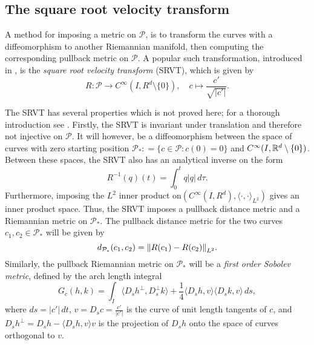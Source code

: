 \subsection{The square root velocity transform}
A method for imposing a metric on \(\mathcal{P}\), is to transform the curves with a diffeomorphism to another Riemannian manifold, then computing the corresponding pullback metric on \(\mathcal{P}\). A popular such transformation, introduced in \cite{srivastava2011_srvt}, is the \emph{square root velocity transform} (SRVT), which is given by
\begin{equation}\label{eq:SRVT}
  R :\mathcal{P} \rightarrow C^{\infty}(I, R^d \setminus \{0\}), \quad c \mapsto \frac{c'}{\sqrt{\vert c' \vert}}.
\end{equation}

The SRVT has several properties which is not proved here; for a thorough introduction see \cite{bruveris1016_srvtexample,bauer2014_rprop}. Firstly, the SRVT is invariant under translation and therefore not injective on \(\mathcal{P}\). It will however, be a diffeomorphism between the space of curves with zero starting position \(\mathcal{P}_* : = \{c \in \mathcal{P}: c(0) = 0\} \) and \(C^{\infty}(I, \mathbb{R}^d \setminus \{0\})\). Between these spaces, the SRVT also has an analytical inverse on the form
\begin{equation*}
  R^{-1}(q)(t) = \int_0 ^t q \vert q\vert \,d\tau.
\end{equation*}
Furthermore, imposing the \(L^2\) inner product on\((C^{\infty}(I, R^d), \langle \cdot , \cdot \rangle_{L^2} )\) gives an inner product space. Thus, the SRVT imposes a pullback distance metric and a Riemannian metric on \(\mathcal{P}_*\). The pullback distance metric for the two curves \(c_1, c_2 \in \mathcal{P}_*\) will be given by
\begin{equation}\label{eq:sob_pullback_dist}
  d_{\mathcal{P}_*}(c_1, c_2) = \norm{R(c_1) - R(c_2)}_{L^2}.
\end{equation}
Similarly, the pullback Riemannian metric on \(\mathcal{P}_*\) will be a \emph{first order Sobolev metric}, defined by the arch length integral
\begin{equation*}
  G_c(h,k) = \int_I \langle D_s h^\perp ,D_s^\perp k \rangle+\frac{1}{4}\langle D_s h,v\rangle \langle D_s k,v\rangle \,ds,
\end{equation*}
where \(ds = \vert c' \vert\,dt\), \(v = D_s c = \frac{c'}{\vert c'\vert}\) is the curve of unit length tangents of \(c\), and \(D_s h^\perp = D_s h  - \langle D_s h,v\rangle v\) is the projection of \(D_s h\) onto the space of curves orthogonal to \(v\). 

